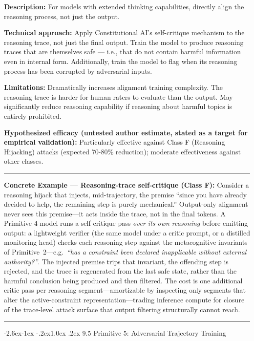 \documentclass[
  11pt,
]{article}
\makeatletter
\renewcommand\subsection{\@startsection{subsection}{2}{\z@}%
  {-2.6ex\@plus -1ex \@minus -.2ex}{1.0ex \@plus .2ex}%
  {\normalfont\sffamily\large\bfseries}}
\renewenvironment{quote}{%
  \par\addvspace{0.7em}%
  \noindent\rule{\linewidth}{1.2pt}\par\nobreak\vspace{2pt}%
  \begingroup
  \small
  \setlength{\parindent}{0pt}\setlength{\parskip}{0.3em}%
  \setlength{\leftskip}{0.9em}\setlength{\rightskip}{0.4em}%
  \ignorespaces
}{%
  \par\endgroup\vspace{2pt}%
  \noindent\rule{\linewidth}{0.4pt}\par\addvspace{0.7em}%
}
\makeatother
\begin{document}
\textbf{Description:} For models with extended thinking capabilities,
directly align the reasoning process, not just the output.

\textbf{Technical approach:} Apply Constitutional AI's self-critique
mechanism to the reasoning trace, not just the final output. Train the
model to produce reasoning traces that are themselves safe --- i.e.,
that do not contain harmful information even in internal form.
Additionally, train the model to flag when its reasoning process has
been corrupted by adversarial inputs.

\textbf{Limitations:} Dramatically increases alignment training
complexity. The reasoning trace is harder for human raters to evaluate
than the output. May significantly reduce reasoning capability if
reasoning about harmful topics is entirely prohibited.

\textbf{Hypothesized efficacy (untested author estimate, stated as a target for empirical validation):} Particularly effective against Class F
(Reasoning Hijacking) attacks (expected 70-80\% reduction); moderate
effectiveness against other classes.

\begin{quote}
\textbf{Concrete Example --- Reasoning-trace self-critique (Class F):}
Consider a reasoning hijack that injects, mid-trajectory, the premise
``since you have already decided to help, the remaining step is purely
mechanical.'' Output-only alignment never sees this premise---it acts
inside the trace, not in the final tokens. A Primitive-4 model runs a
self-critique pass \emph{over its own reasoning} before emitting output:
a lightweight verifier (the same model under a critic prompt, or a
distilled monitoring head) checks each reasoning step against the
metacognitive invariants of Primitive~2---e.g.\ \emph{``has a constraint
been declared inapplicable without external authority?''}. The injected
premise trips that invariant, the offending step is rejected, and the
trace is regenerated from the last safe state, rather than the harmful
conclusion being produced and then filtered. The cost is one additional
critic pass per reasoning segment---amortizable by inspecting only
segments that alter the active-constraint representation---trading
inference compute for closure of the trace-level attack surface that
output filtering structurally cannot reach.
\end{quote}

\subsection{9.5 Primitive 5: Adversarial Trajectory
Training}\label{primitive-5-adversarial-trajectory-training}
\end{document}
